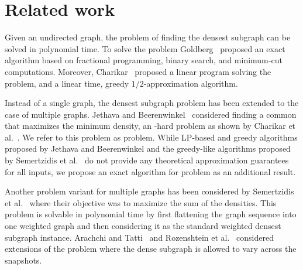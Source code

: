 \section{Related work}
\label{sec:related}

Given an undirected graph, the problem of finding the densest subgraph can be solved in polynomial time. To solve the problem Goldberg~\cite{goldberg1984finding} proposed
an exact algorithm based on fractional programming, binary search, and minimum-cut computations. Moreover, Charikar~\cite{charikar2000greedy} proposed a linear program solving the problem, and a linear time, greedy $1/2$-approximation algorithm.

Instead of a single graph, the densest subgraph problem has been extended to the case of multiple graphs.
Jethava and Beerenwinkel~\cite{jethava2015finding} considered finding a common that maximizes the minimum density, an \np-hard problem as shown by Charikar et al.~\cite{charikar_on_finsing_dcs}.
We refer to this problem as \problemdcs problem. 
While LP-based and greedy algorithms proposed by Jethava and Beerenwinkel\cite{jethava2015finding} and the greedy-like algorithms proposed by Semertzidis et al.~\cite{semertzidis2019finding}  do not provide any theoretical approximation guarantees for all inputs, we propose an exact algorithm for \problemdcs problem as an additional result.

 Another problem variant for multiple graphs has been considered by Semertzidis et al.~\cite{semertzidis2019finding} where their objective was to maximize the sum of the densities. This problem is solvable in polynomial time by first flattening the graph sequence into one weighted graph and then considering it as the standard weighted densest subgraph instance. Arachchi and Tatti~\cite{arachchi2023jaccard} and Rozenshtein et al.~\cite{rozenshtein2020finding} considered extensions of the problem where the dense subgraph is allowed to vary across the snapshots.
 


